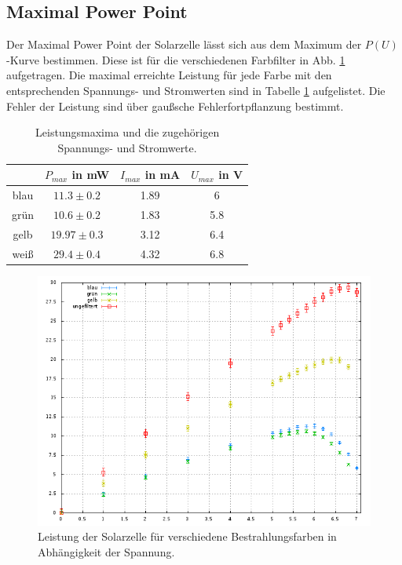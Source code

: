 \subsection*{Maximal Power Point}
Der Maximal Power Point der Solarzelle lässt sich aus dem Maximum der $P(U)$-Kurve bestimmen. Diese ist für die verschiedenen Farbfilter in Abb. \ref{power} aufgetragen. Die maximal erreichte Leistung für jede Farbe mit den entsprechenden Spannungs- und Stromwerten sind in Tabelle \ref{mpp} aufgelistet. Die Fehler der Leistung sind über gaußsche Fehlerfortpflanzung bestimmt.
\begin{table}
\begin{center}
\begin{tabular}{|c|c|c|c|}
&$P_{max}$ in mW&$I_{max}$ in mA&$U_{max}$ in V\\
\hline
blau& $11.3\pm 0.2$ &1.89&6\\
\hline
grün& $10.6\pm 0.2$ &1.83&5.8\\
\hline
gelb& $19.97\pm 0.3$ &3.12&6.4\\
\hline
weiß& $29.4\pm 0.4$ &4.32 &6.8\\
\hline
\end{tabular}
\end{center}
\caption{Leistungsmaxima und die zugehörigen Spannungs- und Stromwerte.\label{mpp}}
\end{table}
\begin{figure}
\includegraphics[scale=0.6]{Auswertung/power.png}
\caption{Leistung der Solarzelle für verschiedene Bestrahlungsfarben in Abhängigkeit der Spannung.\label{power}}
\end{figure}

